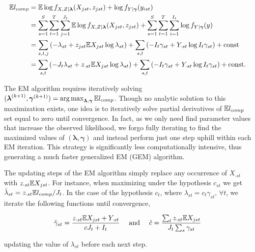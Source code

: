 \begin{align*}
  \mathbb{E} l_{comp} 
  & = \mathbb{E} \log{f_{X,Z|\boldsymbol{\lambda}}(X_{jst},z_{jst})} + \log{f_{Y|\boldsymbol{\gamma}}(y_{ist})} \\
  & = \sum_{s=1}^S \sum_{t=1}^T \sum_{j=1}^{J_t} \mathbb{E} \log{f_{X,Z|\boldsymbol{\lambda}}(X_{jst},z_{jst})}
  + \sum_{s=1}^S \sum_{t=1}^T \sum_{i=1}^{I_t} \log{f_{Y|\boldsymbol{\gamma}}(y)} \\
  & = \sum_{s,t,j} \left( - \lambda_{st} 
    + z_{jst} \mathbb{E} X_{jst} \log{\lambda_{st}}  \right) + \sum_{s,t} \left( -I_t \gamma_{st} + Y_{\cdot st} \log{I_t \gamma_{st}} \right) + \text{const} \\
  & = \sum_{s,t} \left( -J_t \lambda_{st} + z_{\cdot st} \mathbb{E} X_{jst} \log{\lambda_{st}} \right) + \sum_{s,t} \left( -I_t \gamma_{st} + Y_{\cdot st} \log{I_t \gamma_{st}} \right) + \text{const}.
\end{align*}

The EM algorithm requires iteratively solving $(\boldsymbol{\lambda}^{(k+1)},\boldsymbol{\gamma}^{(k+1)}) = \operatorname*{arg\,max}_{\boldsymbol{\lambda},\boldsymbol{\gamma}} \mathbb{E} l_{comp}$.  Though no analytic solution to this maximization exists, one idea is to iteratively solve partial derivatives of $\mathbb{E} l_{comp}$ set equal to zero until convergence.  In fact, as we only need find parameter values that increase the observed likelihood, we forgo fully iterating to find the maximized values of $(\boldsymbol{\lambda}, \boldsymbol{\gamma})$ and instead perform just one step uphill within each EM iteration.  This strategy is significantly less computationally intensive, thus generating a much faster generalized EM (GEM) algorithm.  

The updating steps of the EM algorithm simply replace any occurrence of $X_{\cdot st}$ with $z_{\cdot st}\mathbb{E} X_{jst}$.  For instance, when maximizing under the hypothesis $c_{st}$ we get $\hat{\lambda}_{st} = z_{\cdot st} \mathbb{E} l_{comp} / J_t$.  In the case of the hypothesis $c_t$, where $\lambda_{st} = c_t \gamma_{st}, \, \forall t$, we iterate the following functions until convergence, 

\begin{equation*}
  \hat{\gamma}_{st} = \frac{z_{\cdot st} \mathbb{E} X_{jst} + Y_{\cdot st}}{cJ_t + I_t} \quad \text{ and } \quad \hat{c} = \frac{ \sum_{t} z_{\cdot st} \mathbb{E} X_{jst}}{ J_t \sum_{s} \gamma_{st}}
\end{equation*}

\noindent updating the value of $\lambda_{st}$ before each next step. 

